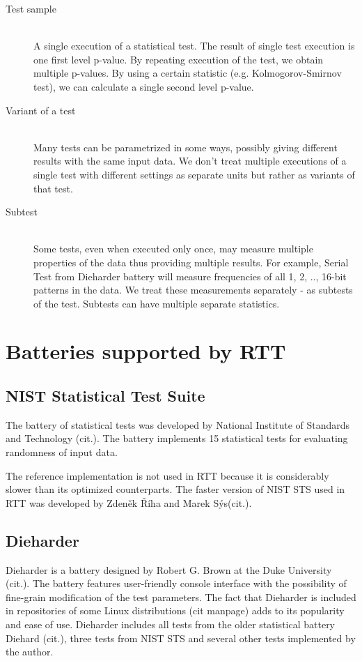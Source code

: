 \documentclass[
  digital,  	%
  color,		%
  oneside,   	%
  12pt,
  nocover,
  notable,
  nolof,
  nolot,
]{fithesis3}
\begin{document}
\begin{description}
\item[Test sample] \hfill \\
A single execution of a statistical test. The result of single test execution is one first level p-value. By repeating execution of the test, we obtain multiple p-values. By using a certain statistic (e.g. Kolmogorov-Smirnov test), we can calculate a single second level p-value.

\item[Variant of a test] \hfill \\
Many tests can be parametrized in some ways, possibly giving different results with the same input data. We don't treat multiple executions of a single test with different settings as separate units but rather as variants of that test.

\item[Subtest] \hfill \\
Some tests, even when executed only once, may measure multiple properties of the data thus providing multiple results. For example, Serial Test from Dieharder battery will measure frequencies of all 1, 2, .., 16-bit patterns in the data. We treat these measurements separately - as subtests of the test. Subtests can have multiple separate statistics.
\end{description}

\section{Batteries supported by RTT}
\subsection{NIST Statistical Test Suite}
The battery of statistical tests was developed by National Institute of Standards and Technology (cit.). The battery implements 15 statistical tests for evaluating randomness of input data.

The reference implementation is not used in RTT because it is considerably slower than its optimized counterparts. The faster version of NIST STS used in RTT was developed by Zdeněk Říha and Marek Sýs(cit.). 

\subsection{Dieharder}
Dieharder is a battery designed by Robert G. Brown at the Duke University (cit.). The battery features user-friendly console interface with the possibility of fine-grain modification of the test parameters. The fact that Dieharder is included in repositories of some Linux distributions (cit manpage) adds to its popularity and ease of use. Dieharder includes all tests from the older statistical battery Diehard (cit.), three tests from NIST STS and several other tests implemented by the author. 
\end{document}
